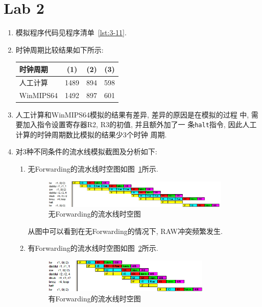 \section{Lab 2}

\begin{solve}
  \begin{enumerate}
  \item 模拟程序代码见程序清单~\ref{lst:3-11}.

    
  \item 时钟周期比较结果如下所示:
    
    \begin{tabular}{lccc}
      \toprule
      时钟周期   & (1)  & (2) & (3) \\\midrule
      人工计算   & 1489 & 894 & 598 \\
      WinMIPS64 & 1492 & 897 & 601 \\\bottomrule
    \end{tabular}
    
  \item 人工计算和WinMIPS64模拟的结果有差异, 差异的原因是在模拟的过程
    中, 需要加入指令设置寄存器R2, R3的初值, 并且额外加了一
    条\texttt{halt}指令, 因此人工计算的时钟周期数比模拟的结果少3个时钟
    周期.
  \item 对3种不同条件的流水线模拟截图及分析如下:
    \begin{enumerate}
    \item 无Forwarding的流水线时空图如图~\ref{fig:3-11-1}所示. 
      
      \begin{figure}[!h]
        \centering
        \includegraphics[width=0.9\textwidth]{img/1.png}
        \caption{无Forwarding的流水线时空图}
        \label{fig:3-11-1}
      \end{figure}

      从图中可以看到在无Forwarding的情况下, RAW冲突频繁发生.
      
    \item 有Forwarding的流水线时空图如图~\ref{fig:3-11-2}所示. 
      
      \begin{figure}[!h]
        \centering
        \includegraphics[width=0.8\textwidth]{img/2.png}
        \caption{有Forwarding的流水线时空图}
        \label{fig:3-11-2}
      \end{figure}


\end{enumerate}
\end{enumerate}
\end{solve}
